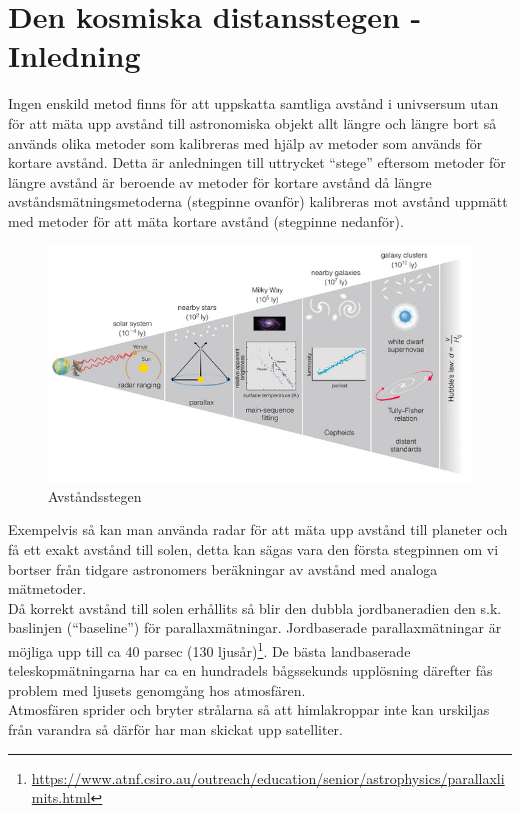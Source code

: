 \documentclass[./exercises.tex]{subfiles}
\begin{document}
\section{Den kosmiska distansstegen -Inledning}
Ingen enskild metod finns för att uppskatta samtliga avstånd i univsersum utan för att mäta
upp avstånd till astronomiska objekt allt längre och längre bort så används olika metoder
som kalibreras med hjälp av metoder som används för kortare avstånd.
Detta är anledningen till uttrycket ``stege'' eftersom metoder för längre avstånd är beroende
av metoder för kortare avstånd då längre avståndsmätningsmetoderna (stegpinne ovanför) kalibreras  mot avstånd
uppmätt med metoder för att mäta kortare avstånd (stegpinne nedanför).

\begin{figure}[H]
  \includegraphics[width=\linewidth]{distance_ladder.jpg}
  \caption{Avståndsstegen}
  \label{fig4}
\end{figure}

 Exempelvis så kan man använda radar för att mäta upp avstånd till
planeter och få ett exakt avstånd till solen, detta kan sägas vara den första stegpinnen om vi bortser
från tidgare astronomers beräkningar av avstånd med analoga mätmetoder.\\
 Då korrekt avstånd till solen erhållits så blir den dubbla jordbaneradien den s.k. baslinjen (``baseline'') för parallaxmätningar.
Jordbaserade parallaxmätningar är möjliga upp till ca 40 parsec (130 ljusår)\footnote{\url{https://www.atnf.csiro.au/outreach/education/senior/astrophysics/parallaxlimits.html}}.
De bästa landbaserade teleskopmätningarna har ca en hundradels bågssekunds upplösning därefter fås problem
med ljusets genomgång hos atmosfären.\\
Atmosfären sprider och bryter strålarna så att himlakroppar inte kan urskiljas från varandra så
därför har man skickat upp satelliter. \\
\end{document}
